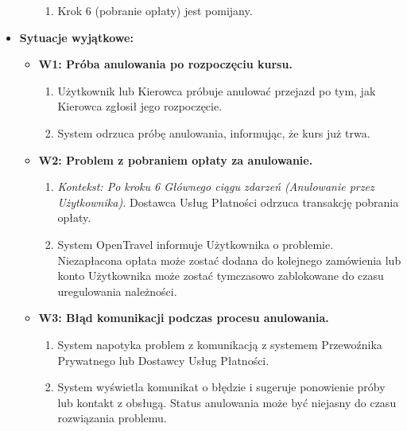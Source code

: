 \documentclass[a4paper,12pt]{article}
\begin{document}
\begin{itemize}
\begin{itemize}
\begin{enumerate}
                    \item Krok 6 (pobranie opłaty) jest pomijany.
                \end{enumerate}
        \end{itemize}
    \item \textbf{Sytuacje wyjątkowe:}
        \begin{itemize}
            \item \textbf{W1: Próba anulowania po rozpoczęciu kursu.}
                \begin{enumerate}
                    \item Użytkownik lub Kierowca próbuje anulować przejazd po tym, jak Kierowca zgłosił jego rozpoczęcie.
                    \item System odrzuca próbę anulowania, informując, że kurs już trwa.
                \end{enumerate}
            \item \textbf{W2: Problem z pobraniem opłaty za anulowanie.}
                \begin{enumerate}
                    \item \textit{Kontekst: Po kroku 6 Głównego ciągu zdarzeń (Anulowanie przez Użytkownika).} Dostawca Usług Płatności odrzuca transakcję pobrania opłaty.
                    \item System OpenTravel informuje Użytkownika o problemie. Niezapłacona opłata może zostać dodana do kolejnego zamówienia lub konto Użytkownika może zostać tymczasowo zablokowane do czasu uregulowania należności.
                \end{enumerate}
            \item \textbf{W3: Błąd komunikacji podczas procesu anulowania.}
                \begin{enumerate}
                    \item System napotyka problem z komunikacją z systemem Przewoźnika Prywatnego lub Dostawcy Usług Płatności.
                    \item System wyświetla komunikat o błędzie i sugeruje ponowienie próby lub kontakt z obsługą. Status anulowania może być niejasny do czasu rozwiązania problemu.
                \end{enumerate}
        \end{itemize}
\end{itemize}
\end{document}
